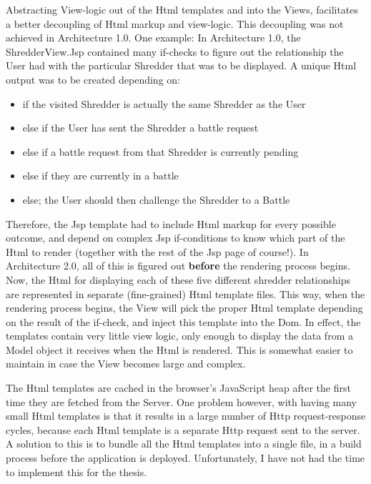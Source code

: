 Abstracting View-logic out of the Html templates and into the Views, facilitates a better decoupling of Html markup and view-logic. This decoupling was not achieved in Architecture 1.0. One example: In Architecture 1.0, the ShredderView.Jsp contained many if-checks to figure out the relationship the User had with the particular Shredder that was to be displayed. A unique Html output was to be created depending on: 
\begin{itemize}
\item{} if the visited Shredder is actually the same Shredder as the User
\item{} else if the User has sent the Shredder a battle request
\item{} else if a battle request from that Shredder is currently pending
\item{} else if they are currently in a battle
\item{} else; the User should then challenge the Shredder to a Battle
\end{itemize}
Therefore, the Jsp template had to include Html markup for every possible outcome, and depend on complex Jsp if-conditions to know which part of the Html to render (together with the rest of the Jsp page of course!). In Architecture 2.0, all of this is figured out \textbf{before} the rendering process begins. Now, the Html for displaying each of these five different shredder relationships are represented in separate (fine-grained) Html template files. This way, when the rendering process begins, the View will pick the proper Html template depending on the result of the if-check, and inject this template into the Dom. In effect, the templates contain very little view logic, only enough to display the data from a Model object it receives when the Html is rendered. This is somewhat easier to maintain in case the View becomes large and complex. 

The Html templates are cached in the browser's JavaScript heap after the first time they are fetched from the Server. One problem however, with having many small Html templates is that it results in a large number of Http request-response cycles, because each Html template is a separate Http request sent to the server. A solution to this is to bundle all the Html templates into a single file, in a build process before the application is deployed. Unfortunately, I have not had the time to implement this for the thesis. 

